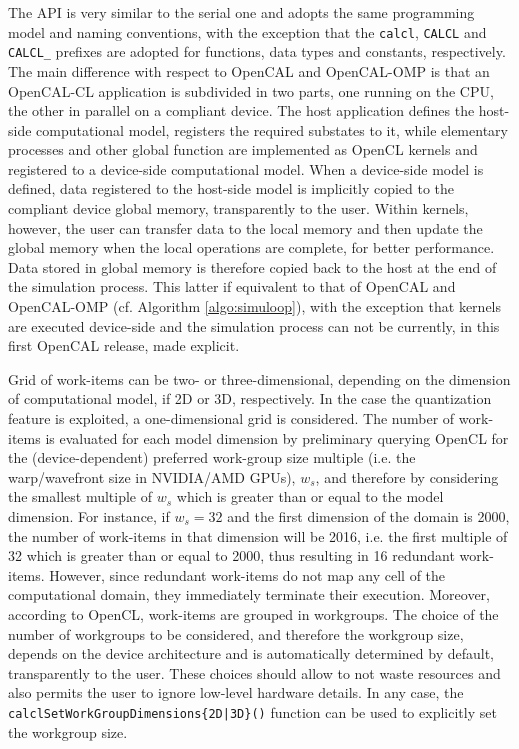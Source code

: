 The API is very similar to the serial one and adopts the same
programming model and naming conventions, with the exception that
the \verb'calcl', \verb'CALCL' and \verb'CALCL_' prefixes are
adopted for functions, data types and constants, respectively. The
main difference with respect to OpenCAL and OpenCAL-OMP is that an
OpenCAL-CL application is subdivided in two parts, one running on
the CPU, the other in parallel on a compliant device. The host
application defines the host-side computational model, registers the
required substates to it, while elementary processes and other
global function are implemented as OpenCL kernels and registered to
a device-side computational model. When a device-side model is
defined, data registered to the host-side model is implicitly copied
to the compliant device global memory, transparently to the
user. Within kernels, however, the user can transfer data to the
local memory and then update the global memory when the local
operations are complete, for better performance. Data stored in
global memory is therefore copied back to the host at the end of
the simulation process. This latter if equivalent to that of OpenCAL
and OpenCAL-OMP (cf. Algorithm \ref{algo:simuloop}), with the
exception that kernels are executed device-side and the simulation
process can not be currently, in this first OpenCAL release, made explicit.

Grid of work-items can be two- or three-dimensional, depending on
the dimension of computational model, if 2D or 3D, respectively. In
the case the quantization feature is exploited, a one-dimensional
grid is considered. The number of work-items is evaluated for each
model dimension by preliminary querying OpenCL for the
(device-dependent) preferred work-group size multiple (i.e. the
warp/wavefront size in NVIDIA/AMD GPUs), $w_s$, and therefore by
considering the smallest multiple of $w_s$ which is greater than or
equal to the model dimension. For instance, if $w_s=32$ and the
first dimension of the domain is 2000, the number of work-items in
that dimension will be 2016, i.e. the first multiple of 32 which is
greater than or equal to 2000, thus resulting in 16 redundant
work-items. However, since redundant work-items do not map any cell
of the computational domain, they immediately terminate their
execution. Moreover, according to OpenCL, work-items are grouped in
workgroups. The choice of the number of workgroups to be considered,
and therefore the workgroup size, depends on the device architecture
and is automatically determined by default, transparently to the
user. These choices should allow to not waste resources and also
permits the user to ignore low-level hardware details. In any case,
the \verb'calclSetWorkGroupDimensions{2D|3D}()' function can be used
to explicitly set the workgroup size.

